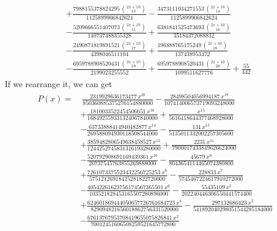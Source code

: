 \documentclass{article}
\begin{document}
\begin{enumerate}
\begin{align}
\begin{split}
            \\ & +\frac{7988155378824295\,\binom{2x+10}{13}}{1125899906842624}
            -\frac{3473111034271553\,\binom{2x+10}{14}}{1125899906842624} 
            \\ & -\frac{5209666551407073\,\binom{2x+10}{15}}{140737488355328}
            +\frac{6381841525473693\,\binom{2x+10}{16}}{35184372088832} 
            \\ & -\frac{2490871819891521\,\binom{2x+10}{17}}{4398046511104}
            +\frac{196888765175249\,\binom{2x+10}{18}}{137438953472}
            \\ & -\frac{6959788908520431\,\binom{2x+10}{19}}{2199023255552}
            +\frac{6959788908520431\,\binom{2x+10}{20}}{1099511627776}
            +\frac{55}{442}
        \end{split}
    \end{align}
    If we rearrange it, we can get
    \begin{align} \label{eq2}
        \begin{split}
            P(x) =
            & \ \frac{2319929636173477\,x^{20} }{850360885375276154880000}
            -\frac{28498504056994187\,x^{18} }{107414006573719093248000}
            \\ & +\frac{1810033522454506651\,x^{16} }{168492559331324067840000}
            +\frac{x^{15} }{5616418644377468928000}
            \\ & -\frac{63733888414940482877\,x^{14} }{269588094930118508544000}
            -\frac{131\,x^{13} }{5135011332002257305600}
            \\ & +\frac{3859482806549638458527\,x^{12} }{1244252745831316193280000}
            +\frac{2231\,x^{11} }{7900017433849626624000}
            \\ & -\frac{520792908691169439361\,x^{10} }{20737545763855269888000}
            -\frac{45679\,x^9 }{8043654114465074380800}
            \\ & +\frac{7261073375523432256725253\,x^8 }{57512126918425281822720000}
            -\frac{228833\,x^7 }{5745467224617910272000}
            \\ & -\frac{40542261623756174567365501\,x^6 }{103521828453165507280896000}
            -\frac{55435109\,x^5 }{202240446306550441574400}
            \\ & +\frac{624601869444050657726761684723\,x^4 }{829094821656018862756331520000}
            -\frac{297132686423\,x^3 }{541892040298051544285184000}
            \\ & -\frac{67613767953708419655075826841\,x^2 }{70012451606508259521645772800}

\end{split}
\end{align}
\end{enumerate}
\end{document}
